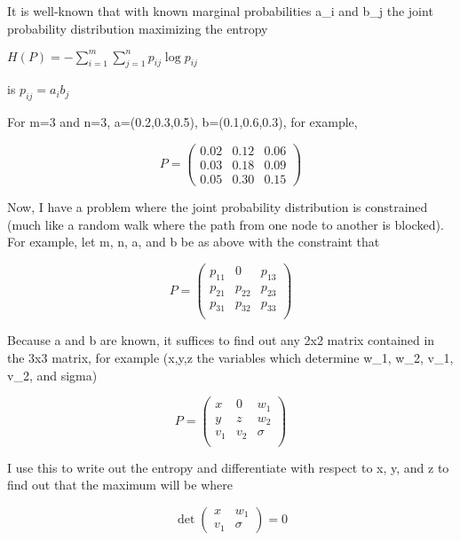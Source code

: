 It is well-known that with known marginal probabilities a_{i} and
b_{j} the joint probability distribution maximizing the entropy

$H(P)=-\sum_{i=1}^{m}\sum_{j=1}^{n}p_{ij}\log{}p_{ij}$

is $p_{ij}=a_{i}b_{j}$ 

For m=3 and n=3, a=(0.2,0.3,0.5), b=(0.1,0.6,0.3), for example,

\begin{equation}
  \label{eq:r1}
P=\left(
  \begin{array}{rrr}
    0.02 & 0.12 & 0.06 \\
    0.03 & 0.18 & 0.09 \\
    0.05 & 0.30 & 0.15
  \end{array}
\right)
\end{equation}

Now, I have a problem where the joint probability distribution is
constrained (much like a random walk where the path from one node to
another is blocked). For example, let m, n, a, and b be as above with
the constraint that

\begin{equation}
  \label{eq:r2}
P=\left(
  \begin{array}{rrr}
    p_{11} & 0 & p_{13} \\
    p_{21} & p_{22} & p_{23} \\
    p_{31} & p_{32} & p_{33} \\
  \end{array}
\right)
\end{equation}

Because a and b are known, it suffices to find out any 2x2 matrix
contained in the 3x3 matrix, for example (x,y,z the variables which
determine w_{1}, w_{2}, v_{1}, v_{2}, and sigma)

\begin{equation}
  \label{eq:r3}
P=\left(
  \begin{array}{rrr}
    x & 0 & w_{1} \\
    y & z & w_{2} \\
    v_{1} & v_{2} & \sigma \\
  \end{array}
\right)
\end{equation}

I use this to write out the entropy and differentiate with respect to
x, y, and z to find out that the maximum will be where

\begin{equation}
  \label{eq:r4}
  \det\left(
    \begin{array}{rr}
      x & w_{1} \\
      v_{1} & \sigma
    \end{array}
\right)=0
\end{equation}


